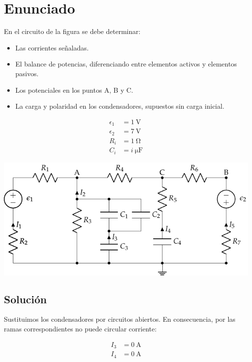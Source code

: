 \section{Enunciado}
En el circuito de la figura se debe determinar:
\begin{itemize}
\item Las corrientes señaladas.
\item El balance de potencias, diferenciando entre elementos activos y
  elementos pasivos.
\item Los potenciales en los puntos A, B y C.
\item La carga y polaridad en los condensadores, supuestos sin carga
  inicial.
\end{itemize}
\begin{minipage}[c]{0.25\linewidth}
  \begin{align*}
    \epsilon_1&=\qty{1}{\volt}\\
    \epsilon_2&=\qty{7}{\volt}\\
    R_i &= \qty{1}{\ohm}\\
    C_i &= \qty[parse-numbers=false]{i}{\micro\farad}
  \end{align*}
\end{minipage}
\begin{minipage}[c]{0.75\linewidth}
  \includegraphics{figuras/mallas_agrupacion_condensadores.pdf}
\end{minipage}

\subsection*{Solución}
Sustituimos los condensadores por circuitos abiertos. En consecuencia, por las ramas correspondientes no puede circular corriente:

\vspace{-4mm}
\begin{align*}
  I_3 &= \boxed{\qty{0}{\ampere}}\\
  I_4 &= \boxed{\qty{0}{\ampere}}
\end{align*}

